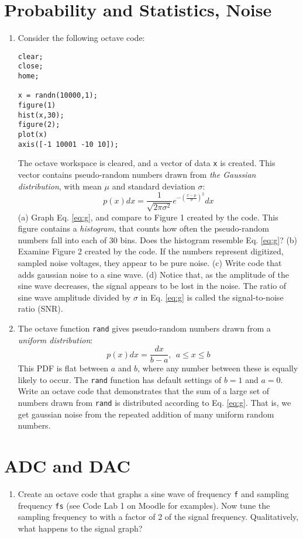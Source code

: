 \documentclass{article}
\begin{document}
\section{Probability and Statistics, Noise}

\begin{enumerate}
\item Consider the following octave code:
\begin{verbatim}
clear;
close;
home;

x = randn(10000,1);
figure(1)
hist(x,30);
figure(2);
plot(x)
axis([-1 10001 -10 10]);
\end{verbatim}
The octave workspace is cleared, and a vector of data \verb+x+ is created.  This vector contains pseudo-random numbers drawn from \textit{the Gaussian distribution}, with mean $\mu$ and standard deviation $\sigma$:
\begin{equation}
p(x) dx = \frac{1}{\sqrt{2\pi \sigma^2}} e^{-\left(\frac{x-\mu}{\sigma}\right)^2} dx \label{eq:g}
\end{equation}
(a) Graph Eq. \ref{eq:g}, and compare to Figure 1 created by the code.  This figure contains a \textit{histogram}, that counts how often the pseudo-random numbers fall into each of 30 bins.  Does the histogram resemble Eq. \ref{eq:g}? (b) Examine Figure 2 created by the code.  If the numbers represent digitized, sampled noise voltages, they appear to be pure noise. (c) Write code that adds gaussian noise to a sine wave. (d) Notice that, as the amplitude of the sine wave decreases, the signal appears to be lost in the noise.  The ratio of sine wave amplitude divided by $\sigma$ in Eq. \ref{eq:g} is called the signal-to-noise ratio (SNR). \\ \vspace{4cm}
\item The octave function \verb+rand+ gives pseudo-random numbers drawn from a \textit{uniform distribution}:
\begin{equation}
p(x) dx = \frac{dx}{b-a}, ~~ a\leq x \leq b
\end{equation}
This PDF is flat between $a$ and $b$, where any number between these is equally likely to occur.  The \verb+rand+ function has default settings of $b=1$ and $a=0$. Write an octave code that demonstrates that the sum of a large set of numbers drawn from \verb+rand+ is distributed according to Eq. \ref{eq:g}.  That is, we get gaussian noise from the repeated addition of many uniform random numbers. \\ \vspace{4cm}
\end{enumerate}

\section{ADC and DAC}

\begin{enumerate}
\item Create an octave code that graphs a sine wave of frequency \verb+f+ and sampling frequency \verb+fs+ (see Code Lab 1 on Moodle for examples).  Now tune the sampling frequency to with a factor of 2 of the signal frequency.  Qualitatively, what happens to the signal graph?
\end{enumerate}
\end{document}
